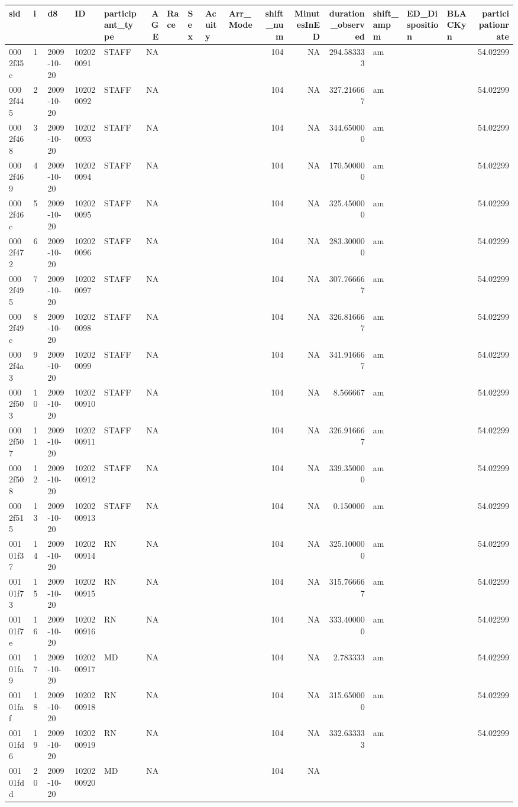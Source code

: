 \documentclass[]{elsarticle} %
\begin{document}
\begin{longtable}[]{@{}lllllrllllrrrlllr@{}}
\toprule
sid & i & d8 & ID & participant\_type & AGE & Race & Sex & Acuity &
Arr\_Mode & shift\_num & MinutesInED & duration\_observed & shift\_ampm
& ED\_Disposition & BLACKyn & participationrate\tabularnewline
\midrule
\endhead
0002f35c & 1 & 2009-10-20 & 102020091 & STAFF & NA & & & & & 104 & NA &
294.583333 & am & & & 54.02299\tabularnewline
0002f445 & 2 & 2009-10-20 & 102020092 & STAFF & NA & & & & & 104 & NA &
327.216667 & am & & & 54.02299\tabularnewline
0002f468 & 3 & 2009-10-20 & 102020093 & STAFF & NA & & & & & 104 & NA &
344.650000 & am & & & 54.02299\tabularnewline
0002f469 & 4 & 2009-10-20 & 102020094 & STAFF & NA & & & & & 104 & NA &
170.500000 & am & & & 54.02299\tabularnewline
0002f46c & 5 & 2009-10-20 & 102020095 & STAFF & NA & & & & & 104 & NA &
325.450000 & am & & & 54.02299\tabularnewline
0002f472 & 6 & 2009-10-20 & 102020096 & STAFF & NA & & & & & 104 & NA &
283.300000 & am & & & 54.02299\tabularnewline
0002f495 & 7 & 2009-10-20 & 102020097 & STAFF & NA & & & & & 104 & NA &
307.766667 & am & & & 54.02299\tabularnewline
0002f49c & 8 & 2009-10-20 & 102020098 & STAFF & NA & & & & & 104 & NA &
326.816667 & am & & & 54.02299\tabularnewline
0002f4a3 & 9 & 2009-10-20 & 102020099 & STAFF & NA & & & & & 104 & NA &
341.916667 & am & & & 54.02299\tabularnewline
0002f503 & 10 & 2009-10-20 & 1020200910 & STAFF & NA & & & & & 104 & NA
& 8.566667 & am & & & 54.02299\tabularnewline
0002f507 & 11 & 2009-10-20 & 1020200911 & STAFF & NA & & & & & 104 & NA
& 326.916667 & am & & & 54.02299\tabularnewline
0002f508 & 12 & 2009-10-20 & 1020200912 & STAFF & NA & & & & & 104 & NA
& 339.350000 & am & & & 54.02299\tabularnewline
0002f515 & 13 & 2009-10-20 & 1020200913 & STAFF & NA & & & & & 104 & NA
& 0.150000 & am & & & 54.02299\tabularnewline
00101f37 & 14 & 2009-10-20 & 1020200914 & RN & NA & & & & & 104 & NA &
325.100000 & am & & & 54.02299\tabularnewline
00101f73 & 15 & 2009-10-20 & 1020200915 & RN & NA & & & & & 104 & NA &
315.766667 & am & & & 54.02299\tabularnewline
00101f7e & 16 & 2009-10-20 & 1020200916 & RN & NA & & & & & 104 & NA &
333.400000 & am & & & 54.02299\tabularnewline
00101fa9 & 17 & 2009-10-20 & 1020200917 & MD & NA & & & & & 104 & NA &
2.783333 & am & & & 54.02299\tabularnewline
00101faf & 18 & 2009-10-20 & 1020200918 & RN & NA & & & & & 104 & NA &
315.650000 & am & & & 54.02299\tabularnewline
00101fd6 & 19 & 2009-10-20 & 1020200919 & RN & NA & & & & & 104 & NA &
332.633333 & am & & & 54.02299\tabularnewline
00101fdd & 20 & 2009-10-20 & 1020200920 & MD & NA & & & & & 104 & NA &

\end{longtable}
\end{document}
